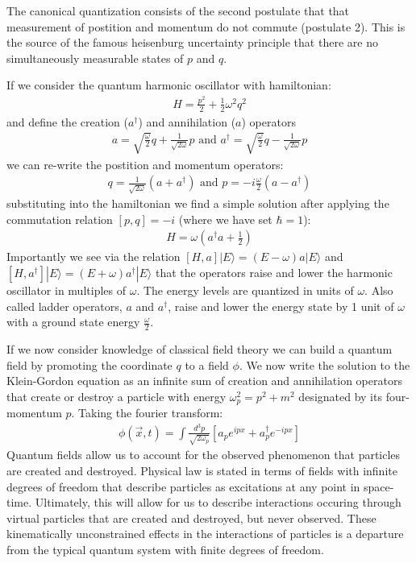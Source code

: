 The canonical quantization consists of the second postulate that that measurement of postition
and momentum do not commute (postulate 2). This is the source of the famous heisenburg uncertainty
principle that there are no simultaneously measurable states of $p$ and $q$. 

If we consider the quantum harmonic oscillator with hamiltonian:
\begin{align*}
H = \frac{p^2}{2} + \frac{1}{2}\omega^2 q^2
\end{align*}
and define the creation ($a^\dagger$) and annihilation ($a$) operators
\begin{align*}
a = \sqrt{\frac{\omega}{2}}q + \frac{1}{\sqrt{2\omega}}p \text{ and   } a^\dagger = \sqrt{\frac{\omega}{2}}q - \frac{1}{\sqrt{2\omega}}p 
\end{align*}
we can re-write the postition and momentum operators:
\begin{align*}
q = \frac{1}{\sqrt{2\omega}} (a + a^\dagger) \text{ and } p = -i \frac{\omega}{2}( a - a^\dagger) 
\end{align*}
 substituting into the hamiltonian we find a simple solution after applying
the commutation relation $[p,q]=-i$ (where we have set $\hbar=1$):
\begin{align*}
H =  \omega(a^\dagger a + \frac{1}{2}) 
\end{align*}
Importantly we see via the relation $[H,a]|E\rangle = (E-\omega)a|E\rangle$ and 
$[H,a^\dagger]|E\rangle = (E+\omega)a^\dagger|E\rangle$ that the operators raise and 
lower the harmonic oscillator in multiples of $\omega$. The energy levels are quantized 
in units of $\omega$. Also called ladder operators, $a$ and $a^\dagger$, raise and lower
the energy state by 1 unit of $\omega$ with a ground state energy $\frac{\omega}{2}$. 

If we now consider knowledge of classical field theory we can build a quantum field by
promoting the coordinate $q$ to a field $\phi$. We now write
the solution to the Klein-Gordon equation as an infinite sum of creation and 
annihilation operators that create or destroy a particle with energy $\omega_p^2 =
p^2 + m^2$ designated by its four-momentum $p$. Taking the fourier transform:
\begin{align*}
\phi(\vec x,t) = \int \frac{d^3p}{\sqrt{2\omega_{p}}} \left [  a_p e^{ipx} + a_p^\dagger e^{-ipx} \right ]
\end{align*} 
Quantum fields allow us to account for the observed phenomenon that particles are created and destroyed. 
Physical law is stated in terms of fields with infinite degrees of freedom that describe particles as excitations 
at any point in space-time. Ultimately, this will allow for us to describe interactions occuring through
 virtual particles that are created and destroyed, but never observed. These kinematically unconstrained effects in the interactions of particles is a departure from the typical quantum system with finite degrees of freedom. 

